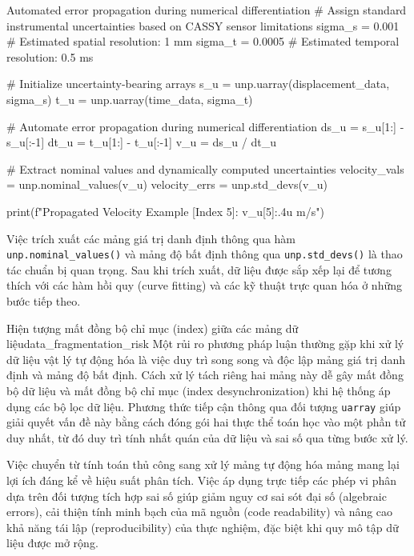 \begin{pycode}{Automated error propagation during numerical differentiation}
# Assign standard instrumental uncertainties based on CASSY sensor limitations
sigma_s = 0.001   # Estimated spatial resolution: 1 mm
sigma_t = 0.0005  # Estimated temporal resolution: 0.5 ms

# Initialize uncertainty-bearing arrays
s_u = unp.uarray(displacement_data, sigma_s)
t_u = unp.uarray(time_data, sigma_t)

# Automate error propagation during numerical differentiation
ds_u = s_u[1:] - s_u[:-1]
dt_u = t_u[1:] - t_u[:-1]
v_u = ds_u / dt_u

# Extract nominal values and dynamically computed uncertainties
velocity_vals = unp.nominal_values(v_u)
velocity_errs = unp.std_devs(v_u)

print(f"Propagated Velocity Example [Index 5]: {v_u[5]:.4u} m/s")
\end{pycode}

Việc trích xuất các mảng giá trị danh định thông qua hàm \texttt{unp.nominal\_values()} và mảng độ bất định thông qua \texttt{unp.std\_devs()} là thao tác chuẩn bị quan trọng. Sau khi trích xuất, dữ liệu được sắp xếp lại để tương thích với các hàm hồi quy (curve fitting) và các kỹ thuật trực quan hóa ở những bước tiếp theo.

\begin{pitfall}{Hiện tượng mất đồng bộ chỉ mục (index) giữa các mảng dữ liệu}{data_fragmentation_risk}
Một rủi ro phương pháp luận thường gặp khi xử lý dữ liệu vật lý tự động hóa là việc duy trì song song và độc lập mảng giá trị danh định và mảng độ bất định. Cách xử lý tách riêng hai mảng này dễ gây mất đồng bộ dữ liệu và mất đồng bộ chỉ mục (index desynchronization) khi hệ thống áp dụng các bộ lọc dữ liệu. Phương thức tiếp cận thông qua đối tượng \texttt{uarray} giúp giải quyết vấn đề này bằng cách đóng gói hai thực thể toán học vào một phần tử duy nhất, từ đó duy trì tính nhất quán của dữ liệu và sai số qua từng bước xử lý.
\end{pitfall}

Việc chuyển từ tính toán thủ công sang xử lý mảng tự động hóa mảng mang lại lợi ích đáng kể về hiệu suất phân tích. Việc áp dụng trực tiếp các phép vi phân dựa trên đối tượng tích hợp sai số giúp giảm nguy cơ sai sót đại số (algebraic errors), cải thiện tính minh bạch của mã nguồn (code readability) và nâng cao khả năng tái lập (reproducibility) của thực nghiệm, đặc biệt khi quy mô tập dữ liệu được mở rộng.